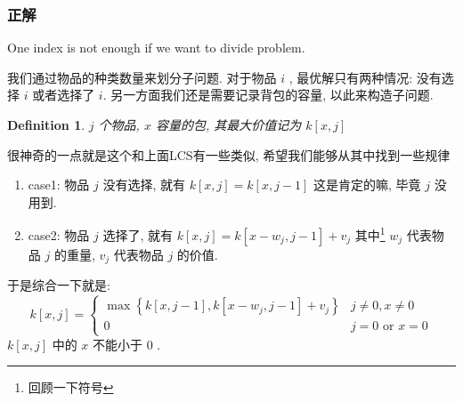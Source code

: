 \documentclass[a4paper, 10pt]{ctexart} %
\newtheorem{definition}{Definition}
\begin{document}
\subsubsection{正解}
One index is not enough if we want to divide problem.

我们通过物品的种类数量来划分子问题. 对于物品 $i$ , 
最优解只有两种情况: 没有选择 $i$ 或者选择了 $i$.
另一方面我们还是需要记录背包的容量, 以此来构造子问题. 

\begin{definition}
    $j$ 个物品, $x$ 容量的包, 其最大价值记为 $k [x  , j]$
\end{definition}

很神奇的一点就是这个和上面LCS有一些类似, 希望我们能够从其中找到一些规律

\begin{enumerate}
    \item 
    case1: 物品 $j$ 没有选择, 就有
    $k [x ,j ] = k \left[  x , j -1\right]$ 
    这是肯定的嘛, 毕竟 $j$ 没用到. 
    \item
    case2: 物品 $j$ 选择了, 就有
    $k\left[ x , j \right] =  k\left[ x - w_j,  j-1\right] + v_j$
    其中\footnote{回顾一下符号} $w_j$ 代表物品 $j$ 的重量, $v_j$ 代表物品 $j$ 的价值.
\end{enumerate}
于是综合一下就是:
\[
k\left[ x , j \right] = 
\begin{cases}
    \max \left\{ k[x,j -1], k\left[x -w_j , j-1\right] +v_j\right\} & j \ne 0 , x \ne 0\\
    0 & j = 0 \text{ or } x = 0
\end{cases}
\]
$k\left[ x, j \right]$ 中的 $x$ 不能小于 $0$ . 
\end{document}

